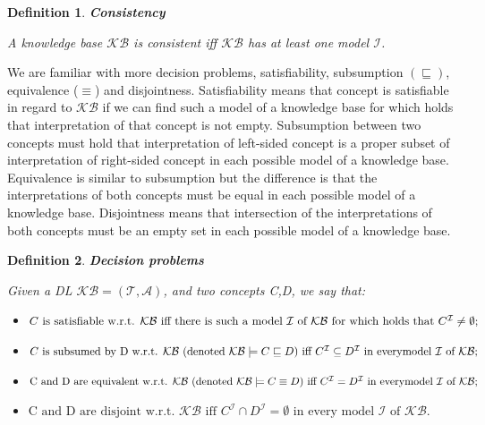 \documentclass[12pt,a4paper]{article}
\newtheorem{definition}{Definition}[subsection]
\begin{document}
\begin{definition}{\textbf{Consistency}}
	
	A knowledge base $\mathcal{KB}$ is consistent iff $\mathcal{KB}$ has at least one model $\mathcal{I}$.
\end{definition}

We are familiar with more decision problems, satisfiability, subsumption $(\sqsubseteq)$, equivalence ($\equiv$) and disjointness. Satisfiability means that concept is satisfiable in regard to $\mathcal{KB}$ if we can find such a model of a knowledge base for which holds that interpretation of that concept is not empty. Subsumption between two concepts must hold that interpretation of left-sided concept is a proper subset of interpretation of right-sided concept in each possible model of a knowledge base. Equivalence is similar to subsumption but the difference is that the interpretations of both concepts must be equal in each possible model of a knowledge base. Disjointness means that intersection of the interpretations of both concepts must be an empty set in each possible model of a knowledge base.

\begin{definition}{\textbf{Decision problems}}

	Given a DL $\mathcal{KB} = (\mathcal{T}, \mathcal{A})$, and two concepts C,D, we say that:

	\begin{itemize}
		\item $C \text{ is satisfiable w.r.t. } \mathcal{KB} \text{ iff there is such a model } \mathcal{I} \text{ of } \mathcal{KB} \text{ for which holds that } \newline C^{\mathcal{I}} \neq \emptyset;$

		\item $C \text{ is subsumed by D w.r.t. } \mathcal{KB} \text{ (denoted } \mathcal{KB} \models C \sqsubseteq D) \text{ iff } C^{\mathcal{I}} \subseteq D^{\mathcal{I}} \text{ in every} \newline \text{model } \mathcal{I} \text{ of } \mathcal{KB};$

		\item $\text{C and D are equivalent w.r.t. } \mathcal{KB} \text{ (denoted } \mathcal{KB} \models C \equiv D) \text{ iff } C^{\mathcal{I}} = D^{\mathcal{I}} \text{ in every} \newline \text{model } \mathcal{I} \text{ of } \mathcal{KB};$
		
		\item $\text{C and D are disjoint w.r.t. } \mathcal{KB} \text{ iff } C^{\mathcal{I}} \cap D^{\mathcal{I}} = \emptyset \text{ in every model } \mathcal{I} \text{ of } \mathcal{KB}.$		
	\end{itemize}
\end{definition}
\end{document}
